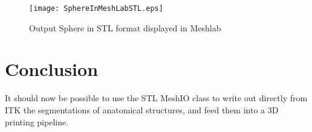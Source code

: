 \documentclass{InsightArticle}
\begin{document}
\begin{figure}[!htb]
\centering
\texttt{[image: SphereInMeshLabSTL.eps]}
\caption{Output Sphere in STL format displayed in Meshlab}
\end{figure}


\section{Conclusion}

It should now be possible to use the STL MeshIO class to write out directly
from ITK the segmentations of anatomical structures, and feed them into a 3D
printing pipeline.



%
%



\end{document}
